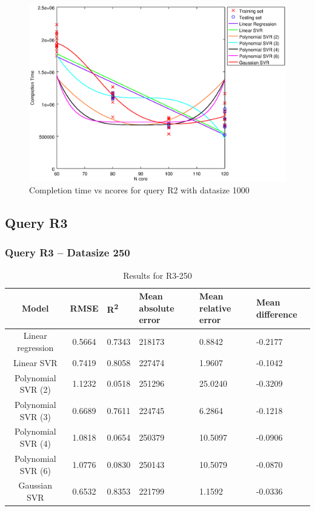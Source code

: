 \documentclass[a4paper,11pt]{article}
\begin{document}
\begin {figure}[hbtp]
\centering
\includegraphics[width=\textwidth]{output/R2_1000_ONLY_1_LINEAR_NCORE/plot_R2_1000.eps}
\caption{Completion time vs ncores for query R2 with datasize 1000}
\label{fig:coreonly_linear_R2_1000}
\end {figure}

\newpage
\subsection{Query R3}
\subsubsection{Query R3 -- Datasize 250}
\begin{table}[H]
	\centering
	\begin{adjustbox}{center}
		\begin{tabular}{c | c M{1.2cm} M{2.5cm} M{2.5cm} M{1.8cm}}
			Model & RMSE & R\textsuperscript{2} & Mean absolute error & Mean relative error & Mean difference \tabularnewline
			\hline
			Linear regression & 0.5664 & 0.7343 & 218173 & 0.8842 & -0.2177 \\
			Linear SVR & 0.7419 & 0.8058 & 227474 & 1.9607 & -0.1042 \\
			Polynomial SVR (2) & 1.1232 & 0.0518 & 251296 & 25.0240 & -0.3209 \\
			Polynomial SVR (3) & 0.6689 & 0.7611 & 224745 & 6.2864 & -0.1218 \\
			Polynomial SVR (4) & 1.0818 & 0.0654 & 250379 & 10.5097 & -0.0906 \\
			Polynomial SVR (6) & 1.0776 & 0.0830 & 250143 & 10.5079 & -0.0870 \\
			Gaussian SVR & 0.6532 & 0.8353 & 221799 & 1.1592 & -0.0336 \\
		\end{tabular}
	\end{adjustbox}
	\\
	\caption{Results for R3-250}
	\label{fig:coreonly_linear_R3_250}
\end{table}
\end{document}
